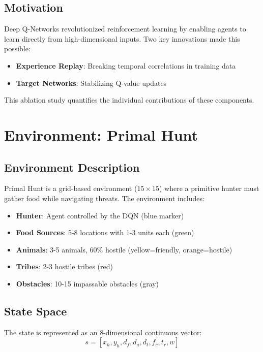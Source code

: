 \documentclass[12pt,a4paper]{article}
\begin{document}
\subsection{Motivation}
Deep Q-Networks revolutionized reinforcement learning by enabling agents to learn directly from high-dimensional inputs. Two key innovations made this possible:
\begin{itemize}
    \item \textbf{Experience Replay}: Breaking temporal correlations in training data
    \item \textbf{Target Networks}: Stabilizing Q-value updates
\end{itemize}

This ablation study quantifies the individual contributions of these components.

\section{Environment: Primal Hunt}

\subsection{Environment Description}
Primal Hunt is a grid-based environment ($15 \times 15$) where a primitive hunter must gather food while navigating threats. The environment includes:

\begin{itemize}
    \item \textbf{Hunter}: Agent controlled by the DQN (blue marker)
    \item \textbf{Food Sources}: 5-8 locations with 1-3 units each (green)
    \item \textbf{Animals}: 3-5 animals, 60\% hostile (yellow=friendly, orange=hostile)
    \item \textbf{Tribes}: 2-3 hostile tribes (red)
    \item \textbf{Obstacles}: 10-15 impassable obstacles (gray)
\end{itemize}

\subsection{State Space}
The state is represented as an 8-dimensional continuous vector:
\begin{equation}
s = [x_h, y_h, d_f, d_a, d_t, f_c, t_r, w]
\end{equation}
\end{document}

